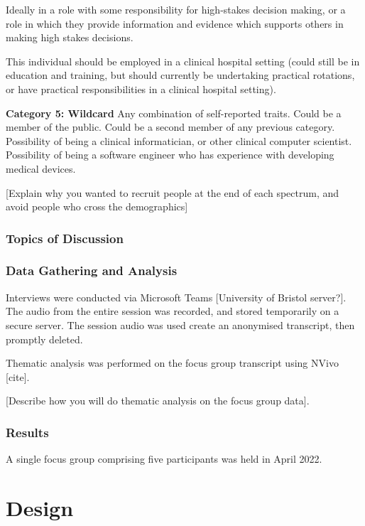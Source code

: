 \documentclass[manuscript,screen,review]{acmart}
\begin{document}
Ideally in a role with some responsibility for high-stakes decision making, or a role in which they provide information and evidence which supports others in making high stakes decisions. 

This individual should be employed in a clinical hospital setting (could still be in education and training, but should currently be undertaking practical rotations, or have practical responsibilities in a clinical hospital setting). 


\textbf{Category 5: Wildcard}
Any combination of self-reported traits.
Could be a member of the public.
Could be a second member of any previous category. 
Possibility of being a clinical informatician, or other clinical computer scientist.
Possibility of being a software engineer who has experience with developing medical devices. 

[Explain why you wanted to recruit people at the end of each spectrum, and avoid people who cross the demographics]

\subsubsection{Topics of Discussion}



\subsubsection{Data Gathering and Analysis}
Interviews were conducted via Microsoft Teams [University of Bristol server?]. The audio from the entire session was recorded, and stored temporarily on a secure server. The session audio was used create an anonymised transcript, then promptly deleted. 

Thematic analysis was performed on the focus group transcript using NVivo [cite]. 

[Describe how you will do thematic analysis on the focus group data].




\subsubsection{Results}
A single focus group comprising five participants was held in April 2022.

\section{Design}
\end{document}
